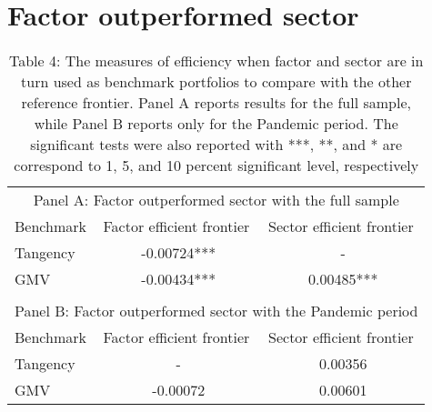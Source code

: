 \documentclass{article}
\begin{document}
\section{Factor outperformed sector}

\begin{table}[htbp]
  \centering
  \caption{Table 4: The measures of efficiency when factor and sector are in turn used as benchmark portfolios to compare with the other reference frontier. Panel A reports results for the full sample, while Panel B reports only for the Pandemic period. The significant tests were also reported with ***, **, and * are correspond to 1, 5, and 10 percent significant level, respectively}
    \begin{tabular}{lcc}
          &       &  \\
    \midrule
    \multicolumn{3}{c}{Panel A: Factor outperformed sector with the full sample} \\
    \midrule
    \midrule
    Benchmark & \multicolumn{1}{l}{Factor efficient frontier} & \multicolumn{1}{l}{Sector efficient frontier} \\
    Tangency & -0.00724*** & - \\
    GMV   & -0.00434*** & 0.00485*** \\
          &       &  \\
    \midrule
    \multicolumn{3}{c}{Panel B: Factor outperformed sector with the Pandemic period} \\
    \midrule
    \midrule
    Benchmark & \multicolumn{1}{l}{Factor efficient frontier} & \multicolumn{1}{l}{Sector efficient frontier} \\
    Tangency & -     & 0.00356 \\
    GMV   & -0.00072 & 0.00601 \\
    \end{tabular}%
  \label{tab:addlabel}%
\end{table}%
\end{document}
